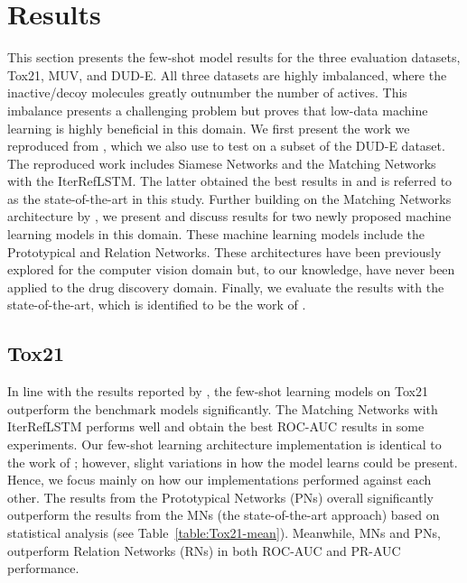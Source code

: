 \section{Results}

This section presents the few-shot model results for the three evaluation datasets, Tox21, MUV, and DUD-E. All three datasets are highly imbalanced, where the inactive/decoy molecules greatly outnumber the number of actives. This imbalance presents a challenging problem but proves that low-data machine learning is highly beneficial in this domain. We first present the work we reproduced from \citet{altae2017low}, which we also use to test on a subset of the DUD-E dataset. The reproduced work includes Siamese Networks \citep{koch2015siamese} and the Matching Networks \citep{vinyals2016matching} with the IterRefLSTM. The latter obtained the best results in \citet{altae2017low} and is referred to as the state-of-the-art in this study. Further building on the Matching Networks architecture by \citet{vinyals2016matching}, we present and discuss results for two newly proposed machine learning models in this domain. These machine learning models include the Prototypical \citep{snell2017prototypical} and Relation \citep{sung2018learning} Networks. These architectures have been previously explored for the computer vision domain but, to our knowledge, have never been applied to the drug discovery domain. Finally, we evaluate the results with the state-of-the-art, which is identified to be the work of \citet{altae2017low}.


\subsection{Tox21}

In line with the results reported by \citet{altae2017low}, the few-shot learning models on Tox21 outperform the benchmark models significantly. The Matching Networks with IterRefLSTM performs well and obtain the best ROC-AUC results in some experiments. Our few-shot learning architecture implementation is identical to the work of \citet{altae2017low}; however, slight variations in how the model learns could be present. Hence, we focus mainly on how our implementations performed against each other. The results from the Prototypical Networks (PNs) overall significantly outperform the results from the MNs (the state-of-the-art approach) based on statistical analysis (see Table~\ref{table:Tox21-mean}). Meanwhile, MNs and PNs, outperform Relation Networks (RNs) in both ROC-AUC and PR-AUC performance. 

